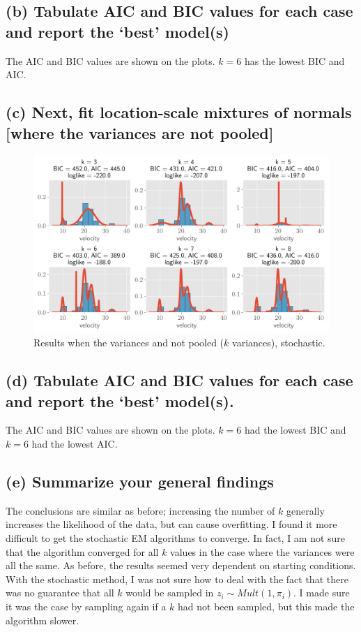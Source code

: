 \documentclass[11pt]{article}
\begin{document}
\subsection*{ (b) Tabulate AIC and BIC values for each case and report the ‘best’ model(s)}

The AIC and BIC values are shown on the plots. $k=6$ has the lowest BIC and AIC.

\subsection*{(c) Next, fit location-scale mixtures of normals [where the variances are not pooled]}

\begin{figure}[!h]
    \centering
    \includegraphics[scale=.6
    ]{homework_4/figures/galaxies_4.png}
    \caption{Results when the variances and not pooled ($k$ variances), stochastic.}
    \label{fig:my_label}
\end{figure}
\newpage
\subsection*{(d) Tabulate AIC and BIC values for each case and report the ‘best’ model(s).}

The AIC and BIC values are shown on the plots. $k=6$ had the lowest BIC and $k=6$ had the lowest AIC.

\subsection*{(e) Summarize your general findings}
The conclusions are similar as before; increasing the number of $k$ generally increases the likelihood of the data, but can cause overfitting.  I found it more difficult to get the stochastic EM algorithms to converge. In fact, I am not sure that the algorithm converged for all $k$ values in the case where the variances were all the same. As before, the results seemed very dependent on starting conditions. With the stochastic method, I was not sure how to deal with the fact that there was no guarantee that all $k$ would be sampled in $z_i \sim Mult(1, \pi_i)$. I made sure it was the case by sampling again if a $k$ had not been sampled, but this made the algorithm slower.
\end{document}
